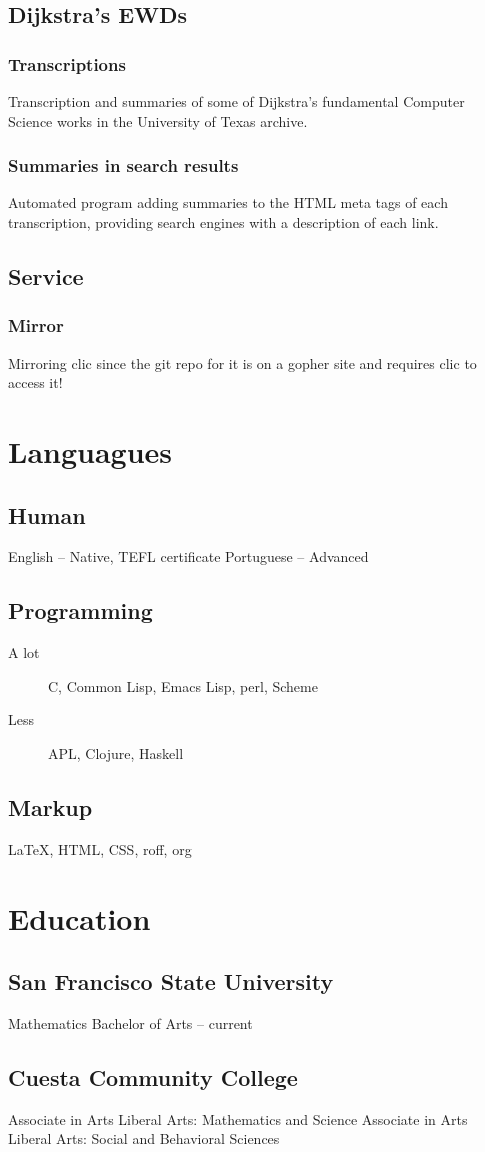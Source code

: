 \subsection{Dijkstra's EWDs}
\subsubsection{Transcriptions}
Transcription and summaries of some of Dijkstra's fundamental Computer Science works in the University of Texas archive.
\subsubsection{Summaries in search results}
Automated program adding summaries to the HTML meta tags of each transcription, providing search engines with a description of each link.
\subsection{Service}
\subsubsection{Mirror} Mirroring clic since the git repo for it is on a gopher site and requires clic to access it!

\section{Languagues}
\subsection{Human}
English -- Native, TEFL certificate
Portuguese -- Advanced
\subsection{Programming}
\begin{description}
    \item[A lot] C, Common Lisp, Emacs Lisp, perl, Scheme
    \item[Less] APL, Clojure, Haskell
\end{description}
\subsection{Markup}
{\LaTeX}, HTML, CSS, roff, org

\section{Education}
\subsection{San Francisco State University}
Mathematics Bachelor of Arts -- current
\subsection{Cuesta Community College}
Associate in Arts
Liberal Arts: Mathematics and Science
Associate in Arts
Liberal Arts: Social and Behavioral Sciences




